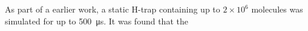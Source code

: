 
As part of a earlier work, \cite{McGarry2018} a static H-trap containing up to
$2 \times 10^6$ molecules was simulated for up to \SI{500}{\micro\second}. It
was found that the
